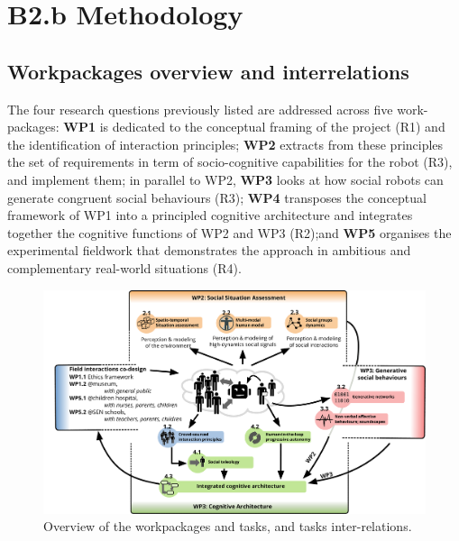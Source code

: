 \newpage

{\let\clearpage\relax\chapter{B2.b Methodology}\label{research-methodology}} %



\section{Workpackages overview and interrelations}\label{workpackage-interrelations}


The four research questions previously listed are addressed across five
work-packages: \textbf{WP1} is dedicated to the conceptual framing of the
project (R1) and the identification of interaction principles; \textbf{WP2}
extracts from these principles the set of requirements in term of
socio-cognitive capabilities for the robot (R3), and implement them; in parallel
to WP2,  \textbf{WP3} looks at how social robots can generate congruent social
behaviours (R3); \textbf{WP4} transposes the conceptual framework of WP1 into a
principled cognitive architecture and integrates together the cognitive
functions of WP2 and WP3 (R2);and \textbf{WP5} organises the experimental
fieldwork that demonstrates the \project approach in ambitious and complementary
real-world situations (R4).



\begin{figure}[h!]
\centering
\includegraphics[width=\linewidth]{figs/wps}
\caption{Overview of the workpackages and tasks, and tasks inter-relations.}
\label{fig:wps}
\end{figure}

